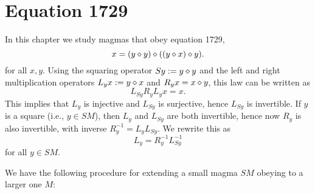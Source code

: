 \chapter{Equation 1729}\label{1729-chapter}

In this chapter we study magmas that obey equation 1729,
\begin{equation}\label{1729}
  x = (y \diamond y) \diamond ((y \diamond x) \diamond y).
\end{equation}
for all $x,y$.  Using the squaring operator $Sy := y \diamond y$ and the left and right multiplication operators $L_y x := y \diamond x$ and $R_y x = x \diamond y$, this law can be written as
$$ L_{Sy} R_y L_{y} x = x.$$
This implies that $L_y$ is injective and $L_{Sy}$ is surjective, hence $L_{Sy}$ is invertible.  If $y$ is a square (i.e., $y \in SM$), then $L_y$ and $L_{Sy}$ are both invertible, hence now $R_y$ is also invertible, with inverse $R_y^{-1} = L_y L_{Sy}$.  We rewrite this as
\begin{equation}\label{lys}
  L_y = R_y^{-1} L_{Sy}^{-1}
\end{equation}
for all $y \in SM$.

We have the following procedure for extending a small magma $SM$ obeying  to a larger one $M$:

